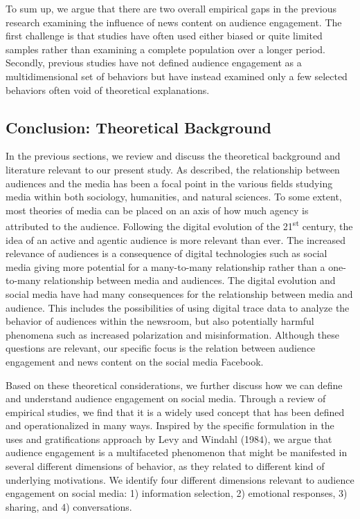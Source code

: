 \documentclass[
]{article}
\begin{document}
To sum up, we argue that there are two overall empirical gaps in the
previous research examining the influence of news content on audience
engagement. The first challenge is that studies have often used either
biased or quite limited samples rather than examining a complete
population over a longer period. Secondly, previous studies have not
defined audience engagement as a multidimensional set of behaviors but
have instead examined only a few selected behaviors often void of
theoretical explanations.

\hypertarget{conclusion-theoretical-background}{%
\subsection{Conclusion: Theoretical
Background}\label{conclusion-theoretical-background}}

In the previous sections, we review and discuss the theoretical
background and literature relevant to our present study. As described,
the relationship between audiences and the media has been a focal point
in the various fields studying media within both sociology, humanities,
and natural sciences. To some extent, most theories of media can be
placed on an axis of how much agency is attributed to the audience.
Following the digital evolution of the 21\textsuperscript{st} century,
the idea of an active and agentic audience is more relevant than ever.
The increased relevance of audiences is a consequence of digital
technologies such as social media giving more potential for a
many-to-many relationship rather than a one-to-many relationship between
media and audiences. The digital evolution and social media have had
many consequences for the relationship between media and audience. This
includes the possibilities of using digital trace data to analyze the
behavior of audiences within the newsroom, but also potentially harmful
phenomena such as increased polarization and misinformation. Although
these questions are relevant, our specific focus is the relation between
audience engagement and news content on the social media Facebook.

Based on these theoretical considerations, we further discuss how we can
define and understand audience engagement on social media. Through a
review of empirical studies, we find that it is a widely used concept
that has been defined and operationalized in many ways. Inspired by the
specific formulation in the uses and gratifications approach by Levy and
Windahl (1984), we argue that audience engagement is a multifaceted
phenomenon that might be manifested in several different dimensions of
behavior, as they related to different kind of underlying motivations.
We identify four different dimensions relevant to audience engagement on
social media: 1) information selection, 2) emotional responses, 3)
sharing, and 4) conversations.
\end{document}
